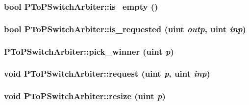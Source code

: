 \hypertarget{classPToPSwitchArbiter_20a229615b20e987aaa0291af0805e31}{
\subsubsection[{is\_\-empty}]{\setlength{\rightskip}{0pt plus 5cm}bool PToPSwitchArbiter::is\_\-empty ()}}
\label{classPToPSwitchArbiter_20a229615b20e987aaa0291af0805e31}


\hypertarget{classPToPSwitchArbiter_3c4eeb723ecb521a82a4518820e48896}{
\subsubsection[{is\_\-requested}]{\setlength{\rightskip}{0pt plus 5cm}bool PToPSwitchArbiter::is\_\-requested ({\bf uint} {\em outp}, \/  {\bf uint} {\em inp})}}
\label{classPToPSwitchArbiter_3c4eeb723ecb521a82a4518820e48896}


\hypertarget{classPToPSwitchArbiter_8b304c2fc07b6c0d55ce25b621a9f685}{
\subsubsection[{pick\_\-winner}]{ PToPSwitchArbiter::pick\_\-winner ({\bf uint} {\em p})}}
\label{classPToPSwitchArbiter_8b304c2fc07b6c0d55ce25b621a9f685}


\hypertarget{classPToPSwitchArbiter_34e8394265869ee076610c67e4cf5de7}{
\subsubsection[{request}]{\setlength{\rightskip}{0pt plus 5cm}void PToPSwitchArbiter::request ({\bf uint} {\em p}, \/  {\bf uint} {\em inp})}}
\label{classPToPSwitchArbiter_34e8394265869ee076610c67e4cf5de7}


\hypertarget{classPToPSwitchArbiter_73fb7254a91aeeb209fa3225f09b1847}{
\subsubsection[{resize}]{\setlength{\rightskip}{0pt plus 5cm}void PToPSwitchArbiter::resize ({\bf uint} {\em p})}}
\label{classPToPSwitchArbiter_73fb7254a91aeeb209fa3225f09b1847}


